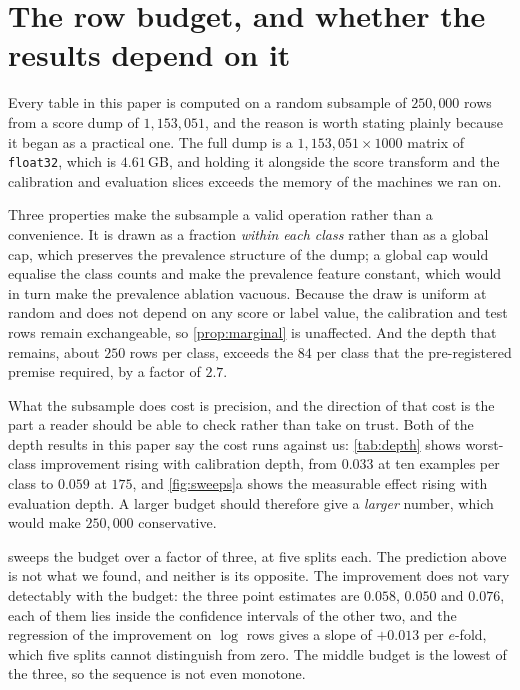 \section{The row budget, and whether the results depend on it}
\label{app:rowbudget}

Every table in this paper is computed on a random subsample of $250{,}000$ rows from a score
dump of $1{,}153{,}051$, and the reason is worth stating plainly because it began as a
practical one. The full dump is a $1{,}153{,}051\times1000$ matrix of \texttt{float32}, which
is $4.61$\,GB, and holding it alongside the score transform and the calibration and evaluation
slices exceeds the memory of the machines we ran on.

Three properties make the subsample a valid operation rather than a convenience. It is drawn
as a fraction \emph{within each class} rather than as a global cap, which preserves the
prevalence structure of the dump; a global cap would equalise the class counts and make the
prevalence feature constant, which would in turn make the prevalence ablation vacuous. Because
the draw is uniform at random and does not depend on any score or label value, the calibration
and test rows remain exchangeable, so \cref{prop:marginal} is unaffected. And the depth that
remains, about $250$ rows per class, exceeds the $84$ per class that the pre-registered premise
required, by a factor of $2.7$.

What the subsample does cost is precision, and the direction of that cost is the part a reader
should be able to check rather than take on trust. Both of the depth results in this paper say
the cost runs against us: \cref{tab:depth} shows worst-class improvement rising with
calibration depth, from $0.033$ at ten examples per class to $0.059$ at $175$, and
\cref{fig:sweeps}a shows the measurable effect rising with evaluation depth. A larger budget
should therefore give a \emph{larger} number, which would make $250{,}000$ conservative.

 sweeps the budget over a factor of three, at five splits each. The
prediction above is not what we found, and neither is its opposite. The improvement does not
vary detectably with the budget: the three point estimates are $0.058$, $0.050$ and $0.076$,
each of them lies inside the confidence intervals of the other two, and the regression of the
improvement on $\log$ rows gives a slope of $+0.013$ per $e$-fold, which five splits cannot
distinguish from zero. The middle budget is the lowest of the three, so the sequence is not
even monotone.


